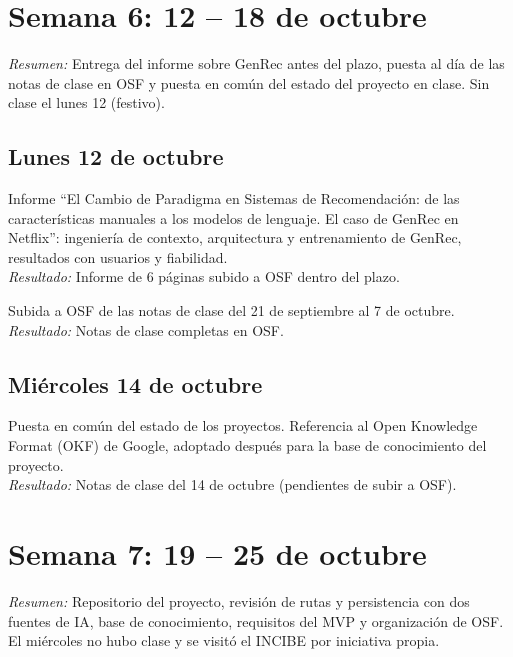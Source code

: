 \documentclass[11pt,a4paper]{article}
\newcommand{\actividad}[3]{\item[\textbf{[#1]}] #2 \\ \textit{Resultado:} #3}
\begin{document}
	\section*{Semana 6: 12 -- 18 de octubre}
	\textit{Resumen:} Entrega del informe sobre GenRec antes del plazo, puesta al día de las notas de clase en OSF y puesta en común del estado del proyecto en clase. Sin clase el lunes 12 (festivo).
	
	\subsection*{Lunes 12 de octubre}
	\begin{description}[leftmargin=0pt, itemsep=6pt]
		\actividad{Documentación}{Informe ``El Cambio de Paradigma en Sistemas de Recomendación: de las características manuales a los modelos de lenguaje. El caso de GenRec en Netflix'': ingeniería de contexto, arquitectura y entrenamiento de GenRec, resultados con usuarios y fiabilidad.}{Informe de 6 páginas subido a OSF dentro del plazo.}
		\actividad{Tarea}{Subida a OSF de las notas de clase del 21 de septiembre al 7 de octubre.}{Notas de clase completas en OSF.}
	\end{description}

	\subsection*{Miércoles 14 de octubre}
	\begin{description}[leftmargin=0pt, itemsep=6pt]
		\actividad{Clase}{Puesta en común del estado de los proyectos. Referencia al Open Knowledge Format (OKF) de Google, adoptado después para la base de conocimiento del proyecto.}{Notas de clase del 14 de octubre (pendientes de subir a OSF).}
	\end{description}

	\section*{Semana 7: 19 -- 25 de octubre}
	\textit{Resumen:} Repositorio del proyecto, revisión de rutas y persistencia con dos fuentes de IA, base de conocimiento, requisitos del MVP y organización de OSF. El miércoles no hubo clase y se visitó el INCIBE por iniciativa propia.
	
\end{document}
